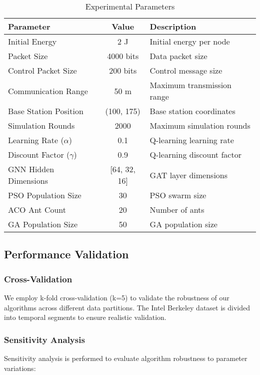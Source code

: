 \documentclass[conference]{IEEEtran}
\begin{document}
\begin{table}[htbp]
\centering
\caption{Experimental Parameters}
\label{tab:experimental_parameters}
\begin{tabular}{|l|c|l|}
\hline
\textbf{Parameter} & \textbf{Value} & \textbf{Description} \\
\hline
Initial Energy & 2 J & Initial energy per node \\
Packet Size & 4000 bits & Data packet size \\
Control Packet Size & 200 bits & Control message size \\
Communication Range & 50 m & Maximum transmission range \\
Base Station Position & (100, 175) & Base station coordinates \\
Simulation Rounds & 2000 & Maximum simulation rounds \\
Learning Rate ($\alpha$) & 0.1 & Q-learning learning rate \\
Discount Factor ($\gamma$) & 0.9 & Q-learning discount factor \\
GNN Hidden Dimensions & [64, 32, 16] & GAT layer dimensions \\
PSO Population Size & 30 & PSO swarm size \\
ACO Ant Count & 20 & Number of ants \\
GA Population Size & 50 & GA population size \\
\hline
\end{tabular}
\end{table}

\subsection{Performance Validation}

\subsubsection{Cross-Validation}

We employ k-fold cross-validation (k=5) to validate the robustness of our algorithms across different data partitions. The Intel Berkeley dataset is divided into temporal segments to ensure realistic validation.

\subsubsection{Sensitivity Analysis}

Sensitivity analysis is performed to evaluate algorithm robustness to parameter variations:
\end{document}
